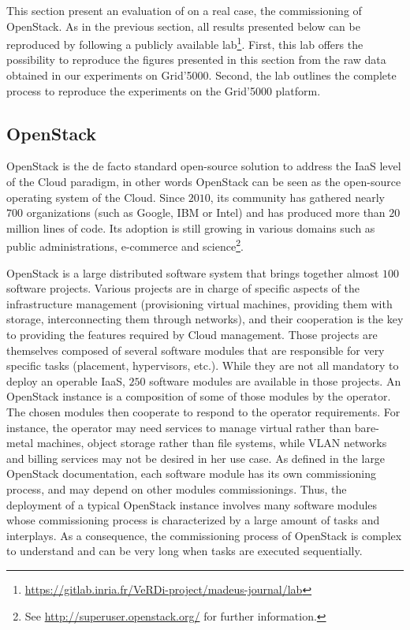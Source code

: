 \graphicspath{{images/}}

This section present an evaluation of \mad on a real case, the
commissioning of OpenStack. As in the previous section, all results
presented below can be reproduced by following a publicly available
lab\footnote{\url{https://gitlab.inria.fr/VeRDi-project/madeus-journal/lab}}. First,
this lab offers the possibility to reproduce the figures presented in
this section from the raw data obtained in our experiments on
Grid'5000. Second, the lab outlines the complete process to reproduce
the experiments on the Grid'5000 platform.

\subsection{OpenStack}
\label{subsec:openstack}

OpenStack is the de facto standard open-source solution to address the
IaaS level of the Cloud paradigm, in other words OpenStack can be seen
as the open-source operating system of the Cloud. Since $2010$, its
community has gathered nearly $700$ organizations (such as Google, IBM
or Intel) and has produced more than $20$ million lines of code. Its
adoption is still growing in various domains such as public
administrations, e-commerce and
science\footnote{See \url{http://superuser.openstack.org/} for further
information.}.

OpenStack is a large distributed software system that brings together
almost $100$ software projects. Various projects are in charge of
specific aspects of the infrastructure management (\eg provisioning
virtual machines, providing them with storage, interconnecting them
through networks), and their cooperation is the key to providing the
features required by Cloud management.
%
Those projects are themselves composed of several software modules
that are responsible for very specific tasks (\eg placement,
hypervisors, etc.). While they are not all mandatory to deploy an
operable IaaS, $250$ software modules are available in those projects.
%
An OpenStack instance is a composition of some of those modules by the
operator. The chosen modules then cooperate to respond to the operator
requirements. For instance, the operator may need services to manage
virtual rather than bare-metal machines, object storage rather than
file systems, while VLAN networks and billing services may not be
desired in her use case. As defined in the large OpenStack
documentation, each software module has its own commissioning process,
and may depend on other modules commissionings.
%
Thus, the deployment of a typical OpenStack instance involves many
software modules whose commissioning process is characterized by a
large amount of tasks and interplays. As a consequence, the
commissioning process of OpenStack is complex to understand and can be
very long when tasks are executed sequentially.

